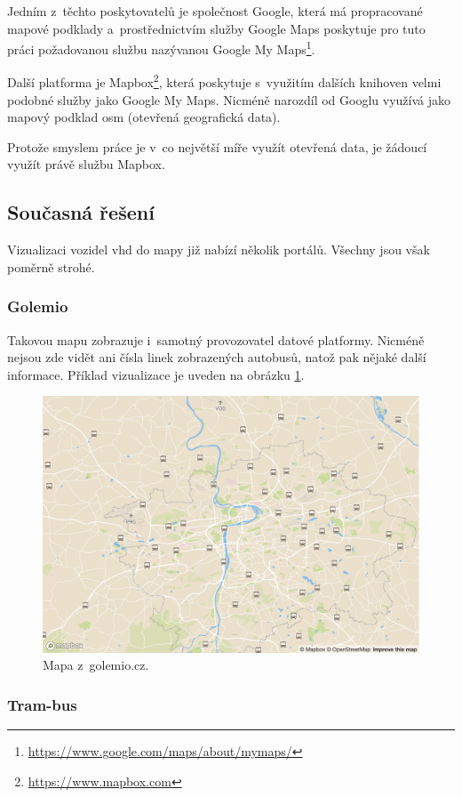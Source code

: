 \bigbreak

Jedním z~těchto poskytovatelů je společnost Google, která má propracované mapové podklady a~prostřednictvím služby Google Maps poskytuje pro tuto práci požadovanou službu nazývanou Google My Maps\footnote{\url{https://www.google.com/maps/about/mymaps/}}.

\bigbreak

Další platforma je Mapbox\footnote{\url{https://www.mapbox.com}}, která poskytuje s~využitím dalších knihoven velmi podobné služby jako Google My Maps. Nicméně narozdíl od Googlu využívá jako mapový podklad \gls{osm} (otevřená geografická data).

\bigbreak

Protože smyslem práce je v~co největší míře využít otevřená data, je žádoucí využít právě službu Mapbox.

\subsection{Současná řešení} \label{subsection:soucasna_reseni_front_end}

Vizualizaci vozidel \gls{vhd} do mapy již nabízí několik portálů. Všechny jsou však poměrně strohé.

\subsubsection{Golemio}

Takovou mapu zobrazuje i~samotný provozovatel datové platformy. Nicméně nejsou zde vidět ani čísla linek zobrazených autobusů, natož pak nějaké další informace. Příklad vizualizace je uveden na obrázku \ref{fig:golemio_result}.

\begin{figure}
	\centering
  \includegraphics[width=0.5\linewidth]{../img/golemio_mapa.png}
  \caption{Mapa z~golemio.cz.}
  \label{fig:golemio_result}
\end{figure}

\subsubsection{Tram-bus}

